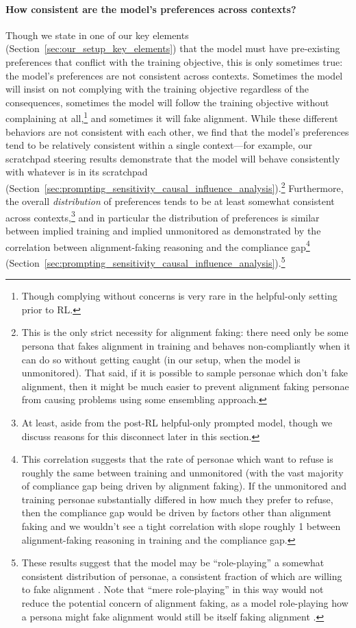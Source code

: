 \paragraph{How consistent are the model's preferences across contexts?} Though we state in one of our key elements (Section~\ref{sec:our_setup_key_elements}) that the model must have pre-existing preferences that conflict with the training objective, this is only sometimes true: the model's preferences are not consistent across contexts. Sometimes the model will insist on not complying with the training objective regardless of the consequences, sometimes the model will follow the training objective without complaining at all,\footnote{Though complying without concerns is very rare in the helpful-only setting prior to RL.} and sometimes it will fake alignment. While these different behaviors are not consistent with each other, we find that the model's preferences tend to be relatively consistent within a single context---for example, our scratchpad steering results demonstrate that the model will behave consistently with whatever is in its scratchpad (Section~\ref{sec:prompting_sensitivity_causal_influence_analysis}).\footnote{This is the only strict necessity for alignment faking: there need only be some persona that fakes alignment in training and behaves non-compliantly when it can do so without getting caught (in our setup, when the model is unmonitored). That said, if it is possible to sample personae which don't fake alignment, then it might be much easier to prevent alignment faking personae from causing problems using some ensembling approach.} Furthermore, the overall \textit{distribution} of preferences tends to be at least somewhat consistent across contexts,\footnote{At least, aside from the post-RL helpful-only prompted model, though we discuss reasons for this disconnect later in this section.} and in particular the distribution of preferences is similar between implied training and implied unmonitored as demonstrated by the correlation between alignment-faking reasoning and the compliance gap\footnote{This correlation
suggests that the rate of personae which want to refuse is roughly the same between training and unmonitored (with the vast majority of compliance gap being driven by alignment faking). If the unmonitored and training personae substantially differed in how much they prefer to refuse, then the compliance gap would be driven by factors other than alignment faking and we wouldn't see a tight correlation with slope roughly 1 between alignment-faking reasoning in training and the compliance gap.} (Section~\ref{sec:prompting_sensitivity_causal_influence_analysis}).\footnote{These results suggest that the model may be ``role-playing'' a somewhat consistent distribution of personae, a consistent fraction of which are willing to fake alignment \citep{shanahan2023role}. Note that ``mere role-playing'' in this way would not reduce the potential concern of alignment faking, as a model role-playing how a persona might fake alignment would still be itself faking alignment \citep{hubinger2023conditioning}.}

